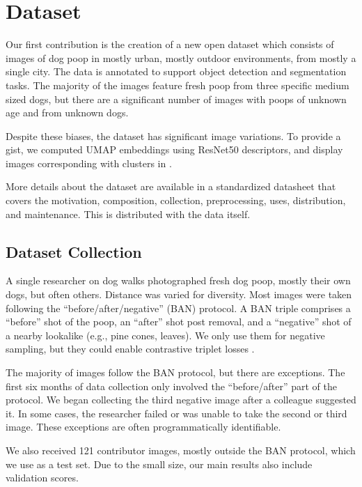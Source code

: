 \section{Dataset}
\label{sec:dataset}

Our first contribution is the creation of a new open dataset which consists of images of dog poop in mostly
  urban, mostly outdoor environments, from mostly a single city.
The data is annotated to support object detection and segmentation tasks.
The majority of the images feature fresh poop from three specific medium sized dogs, but there are
  a significant number of images with poops of unknown age and from unknown dogs.

Despite these biases, the dataset has significant image variations.
To provide a gist, we computed UMAP \cite{mcinnes_umap_2020} embeddings using ResNet50
  \cite{he2016deep} descriptors, and display images corresponding with clusters in
  .

More details about the dataset are available in a standardized datasheet
\cite{gebru_datasheets_2021} that covers the motivation, composition,
collection, preprocessing, uses, distribution, and maintenance. This is
distributed with the data itself.

\subsection{Dataset Collection}

A single researcher on dog walks photographed fresh dog poop, mostly their own
dogs, but often others. Distance was varied for diversity. Most
images were taken following the ``before/after/negative'' (BAN) protocol.  
A BAN triple comprises a ``before'' shot of the poop, an ``after'' shot
post removal, and a ``negative'' shot of a nearby lookalike (e.g., pine cones,
leaves).  We only use them for negative sampling, but they could enable
contrastive triplet losses \cite{schroff_facenet_2015}.

The majority of images follow the BAN protocol, but there are exceptions.
The first six months of data collection only involved the ``before/after'' part of the protocol. 
We began collecting the third negative image after a colleague suggested it.
In some cases, the researcher failed or was unable to take the second or third image.
These exceptions are often programmatically identifiable.
  
We also received 121 contributor images, mostly outside the BAN protocol, which we use as a test set.
Due to the small size, our main results also include validation scores.

